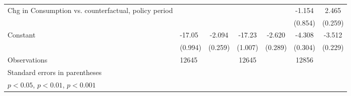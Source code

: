 \begin{table}[htbp]
\begin{tabular}{p{0.8in}l*{5}{c}}
Chg in Consumption vs. counterfactual, policy period&                     &                     &                     &                     &      -1.154         &       2.465\sym{***}\\
                    &                     &                     &                     &                     &     (0.854)         &     (0.259)         \\
Constant            &      -17.05\sym{***}&      -2.094\sym{***}&      -17.23\sym{***}&      -2.620\sym{***}&      -4.308\sym{***}&      -3.512\sym{***}\\
                    &     (0.994)         &     (0.259)         &     (1.007)         &     (0.289)         &     (0.304)         &     (0.229)         \\
\hline
Observations        &       12645         &                     &       12645         &                     &       12856         &                     \\
\hline\hline
\multicolumn{7}{l}{\footnotesize Standard errors in parentheses}\\
\multicolumn{7}{l}{\footnotesize \sym{*} \(p<0.05\), \sym{**} \(p<0.01\), \sym{***} \(p<0.001\)}\\
\end{tabular}
\end{table}
